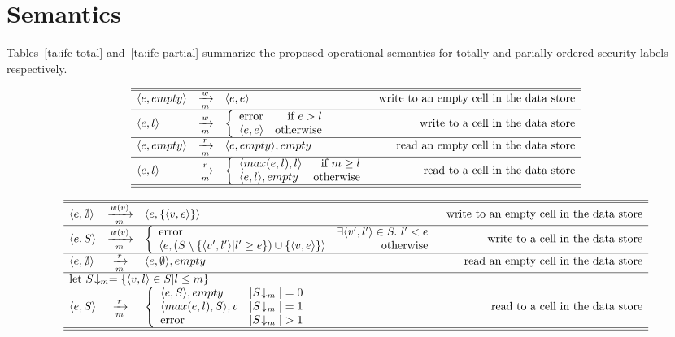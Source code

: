 \section{Semantics}

Tables~\ref{ta:ifc-total} and~\ref{ta:ifc-partial} summarize the 
proposed operational semantics for totally and parially ordered
security labels respectively.

\begin{table}
\[
\begin{array}{lclr}
\hline\hline
\langle e,empty \rangle & \xrightarrow[m]{w} & \langle e,e \rangle & \mbox{write to an empty cell in the data store}\\
\hline
\langle e,l \rangle & \xrightarrow[m]{w} & \left \{ \begin{array}{lr} \mbox{error} & \mbox{if} ~ e > l \\ \langle e,e \rangle & \mbox{otherwise} \end{array} \right. & \mbox{write to a cell in the data store}\\
\hline
\langle e,empty \rangle & \xrightarrow[m]{r} & \langle e,empty \rangle, empty & \mbox{read an empty cell in the data store}\\
\hline
\langle e,l \rangle & \xrightarrow[m]{r} & \left \{ \begin{array}{lr} \langle max(e,l),l \rangle & \mbox{if} ~ m \geq l \\ \langle e,l \rangle, empty & \mbox{otherwise} \end{array} \right. & \mbox{read to a cell in the data store}\\
\hline\hline
\end{array}
\]
\caption{\label{ta:ifc-total}%
Small-step operational semantics for enforcing IFC with a total order over the security labels. $m$ is a paramater of the program execution s.t. m is the maximal security label allowed for the execution.}
\end{table}

\begin{table}
\[
\begin{array}{lclr}
\hline\hline
\semrule{\tuple{e,\emptyset}}{w(v)}{\tuple{e,\{\tuple{v,e}\}}}{\mbox{write to an empty cell in the data store}}\\
\hline
\semrule{\tuple{e,S}}
        {w(v)}
        {\case{\mbox{error}}
              {\exists \tuple{v',l'} \in S. ~ l' < e}
              {\tuple{e,(S \setminus \{\tuple{v',l'} | l' \geq e \}) \cup \{\tuple{v,e}\}}}
              {\mbox{otherwise}}}
        {\mbox{write to a cell in the data store}}\\
\hline
\semrule{\tuple{e,\emptyset}} {r} {\tuple{e,\emptyset}, empty} {\mbox{read an empty cell in the data store}}\\
\hline
\multicolumn{4} {l} {\mbox{let}~ S\!\downarrow_m = \{\tuple{v,l}\in S | l \leq m\} }\\
\semrule{\tuple{e,S}}
        {r}
        {\casethree{\tuple{e,S}, empty} {|S\!\downarrow_m| = 0}
                   {\tuple{max(e,l), S}, v} {|S\!\downarrow_m| = 1}
                   {\mbox{error}}{|S\!\downarrow_m| > 1}}
        {\mbox{read to a cell in the data store}}\\
\hline\hline
\end{array}
\]
\caption{\label{ta:ifc-partial}%
Small-step operational semantics for enforcing IFC with a partial order over the security labels. $m$ is a paramater of the program execution s.t. m is the maximal security label allowed for the execution.}
\end{table}

